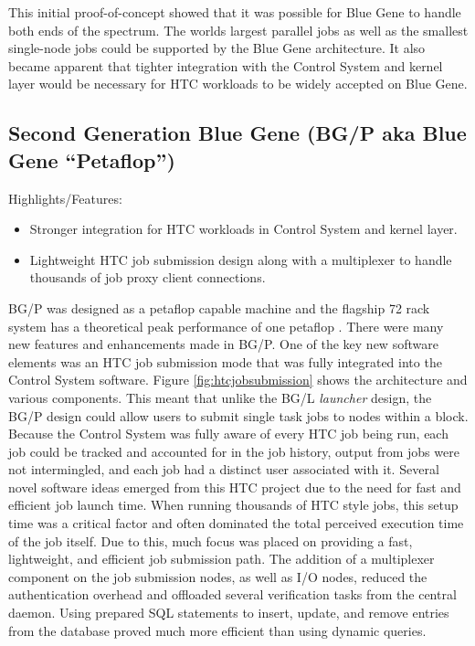 This initial proof-of-concept showed that it was possible for Blue Gene to handle both ends of the spectrum. The worlds largest parallel jobs as well as the smallest single-node jobs could be supported by the Blue Gene architecture. It also became apparent that tighter integration with the Control System and kernel layer would be necessary for HTC workloads to be widely accepted on Blue Gene.

\subsection{Second Generation Blue Gene (BG/P aka Blue Gene ``Petaflop'')}
\label{sec:BGP}

Highlights/Features:
\begin{itemize}
\item Stronger integration for HTC workloads in Control System and kernel layer.
\item Lightweight HTC job submission design along with a multiplexer to handle thousands of job proxy client connections.
\end{itemize}

BG/P was designed as a petaflop capable machine and the flagship 72 rack system has a theoretical peak
performance of one petaflop \cite{website:jugene}. There were many new features and enhancements made in BG/P.
One of the key new software elements was an HTC job submission mode that was fully integrated into the Control
System software. Figure \ref{fig:htcjobsubmission} shows the architecture and various components. This meant
that unlike the BG/L \emph{launcher} design, the BG/P design could allow users to submit single task jobs to
nodes within a block. Because the Control System was fully aware of every HTC job being run, each job could be
tracked and accounted for in the job history, output from jobs were not intermingled, and each job had a
distinct user associated with it. Several novel software ideas emerged from this HTC project due to the need
for fast and efficient job launch time. When running thousands of HTC style jobs, this setup time was a
critical factor and often dominated the total perceived execution time of the job itself. Due to this, much
focus was placed on providing a fast, lightweight, and efficient job submission path. The addition of a
multiplexer component on the job submission nodes, as well as I/O nodes, reduced the authentication overhead
and offloaded several verification tasks from the central daemon. Using prepared SQL statements to insert,
update, and remove entries from the database proved much more efficient than using dynamic queries.


